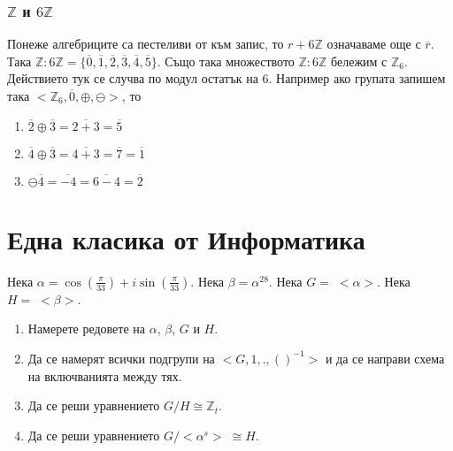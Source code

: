 \documentclass[12pt]{article}
\begin{document}
\subsubsection{\(\mathbb{Z}\) и \(6\mathbb{Z}\)}
Понеже алгебриците са пестеливи от към запис, то \(r + 6\mathbb{Z}\) означаваме още с \(\overline{r}\). Така \(\mathbb{Z} : 6\mathbb{Z} = \{\overline{0}, \overline{1}, \overline{2}, \overline{3}, \overline{4}, \overline{5}\}\).
Също така множеството \(\mathbb{Z} : 6\mathbb{Z}\) бележим с \(\mathbb{Z}_6\).
Действието тук се случва по модул  остатък на \(6\).
Например ако групата запишем така \(<\mathbb{Z}_6, \overline{0}, \oplus, \ominus>\), то
\begin{enumerate}
    \item \(\overline{2} \oplus \overline{3} = \overline{2 + 3} = \overline{5}\)
    \item \(\overline{4} \oplus \overline{3} = \overline{4 + 3} = \overline{7} = \overline{1}\)
    \item \(\ominus \overline{4} = \overline{-4} = \overline{6 - 4} = \overline{2}\)
\end{enumerate}
\section{Една класика от Информатика}
Нека \(\alpha = \cos\left(\displaystyle\frac{\pi}{33}\right) + i\sin\left(\displaystyle\frac{\pi}{33}\right)\).
Нека \(\beta = \alpha^{28}\). Нека \(G = \; <\alpha>\).
Нека \(H = \; <\beta>\).
\begin{enumerate}[label=\alph*)]
    \item Намерете редовете на \(\alpha\), \(\beta\), \(G\) и \(H\).
    \item Да се намерят всички подгрупи на \(<G, 1, ., ()^{-1}>\) и да се направи схема на включванията между тях.
    \item Да се реши уравнението \(G / H \cong \mathbb{Z}_t\).
    \item Да се реши уравнението \(G / <\alpha^s> \; \cong H\).
\end{enumerate}
\end{document}
